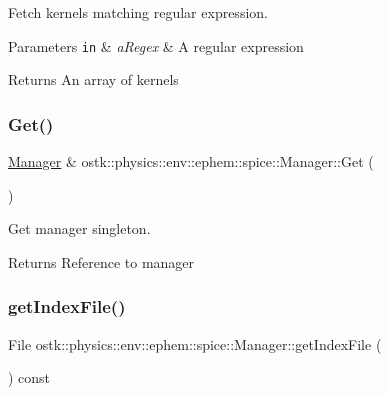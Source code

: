 Fetch kernels matching regular expression. 


\begin{DoxyParams}[1]{Parameters}
\mbox{\tt in}  & {\em a\+Regex} & A regular expression \\
\hline
\end{DoxyParams}
\begin{DoxyReturn}{Returns}
An array of kernels 
\end{DoxyReturn}
\mbox{\label{classostk_1_1physics_1_1env_1_1ephem_1_1spice_1_1_manager_a9662ac46fe23c562941b4ade980f30dd}} 
\subsubsection{\texorpdfstring{Get()}{Get()}}
{\footnotesize\ttfamily \hyperlink{classostk_1_1physics_1_1env_1_1ephem_1_1spice_1_1_manager}{Manager} \& ostk\+::physics\+::env\+::ephem\+::spice\+::\+Manager\+::\+Get (\begin{DoxyParamCaption}{ }\end{DoxyParamCaption})\hspace{0.3cm}{\ttfamily [static]}}



Get manager singleton. 

\begin{DoxyReturn}{Returns}
Reference to manager 
\end{DoxyReturn}
\mbox{\label{classostk_1_1physics_1_1env_1_1ephem_1_1spice_1_1_manager_a64f056cb9d851c9cf0842db81d85d468}} 
\subsubsection{\texorpdfstring{get\+Index\+File()}{getIndexFile()}}
{\footnotesize\ttfamily File ostk\+::physics\+::env\+::ephem\+::spice\+::\+Manager\+::get\+Index\+File (\begin{DoxyParamCaption}{ }\end{DoxyParamCaption}) const}



